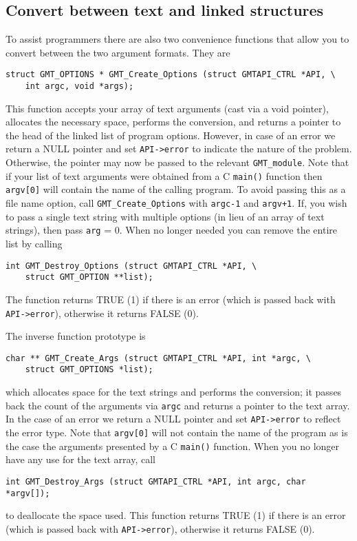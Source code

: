 \documentclass[11pt]{report}
\begin{document}
\subsection{Convert between text and linked structures}

To assist programmers there are also two convenience functions that
allow you to convert between the two argument formats.  They are

\begin{verbatim}
struct GMT_OPTIONS * GMT_Create_Options (struct GMTAPI_CTRL *API, \
    int argc, void *args);
\end{verbatim}
This function accepts your array of text arguments (cast via a void pointer), allocates the necessary
space, performs the conversion, and returns a pointer to the
head of the linked list of program options.  However, in case of an error
we return a NULL pointer and set \texttt{API->error} to indicate the nature of the problem.
Otherwise, the pointer may now be passed to the
relevant \texttt{GMT\_module}.  Note that if your list of text arguments
were obtained from a C \texttt{main()} function then \texttt{argv[0]} will
contain the name of the calling program.  To avoid passing this as a file
name option, call \texttt{GMT\_Create\_Options} with \texttt{argc-1}
and \texttt{argv+1}.  If, you wish to pass a single text string with
multiple options (in lieu of an array of text strings), then pass \texttt{arg} = 0.
When no longer needed you can remove the entire list by calling
\begin{verbatim}
int GMT_Destroy_Options (struct GMTAPI_CTRL *API, \
    struct GMT_OPTION **list);
\end{verbatim}
The function returns TRUE (1) if there is an error (which is passed back with \texttt{API->error}),
otherwise it returns FALSE (0).

The inverse function prototype is
\begin{verbatim}
char ** GMT_Create_Args (struct GMTAPI_CTRL *API, int *argc, \
    struct GMT_OPTIONS *list);
\end{verbatim}
\index{GMT\_Create\_Args}
which allocates space for the text strings and performs the conversion;
it passes back the count of the arguments via \texttt{argc} and returns a pointer to the text array.
In the case of an error we return a NULL pointer and set \texttt{API->error} to reflect the error type.
Note that \texttt{argv[0]} will not contain the name of the program as
is the case the arguments presented by a C \texttt{main()} function.
When you no longer have any use for the text array, call
\begin{verbatim}
int GMT_Destroy_Args (struct GMTAPI_CTRL *API, int argc, char *argv[]);
\end{verbatim}
to deallocate the space used.  This function returns TRUE (1) if there is an error
(which is passed back with \texttt{API->error}),
otherwise it returns FALSE (0).
\end{document}
